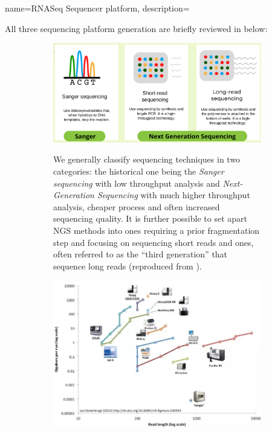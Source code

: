 {name=RNASeq Sequencer platform,
description={
All three sequencing platform generation are briefly reviewed in  below:
\begin{figure}
     \centering
     \begin{subfigure}[p]{0.4\textwidth}
         \centering
         \includegraphics[width=\textwidth]{figures/biological_introduction/Different types of sequencing techniques.png}
         \label{subfig:brief-library-comparison}
         \caption[\textbf{Sequencing techniques}]{We generally classify  sequencing techniques in two categories: the historical one being the \textit{Sanger sequencing} with low throughput analysis and \textit{Next-Generation Sequencing} with much higher throughput analysis, cheaper process and often increased sequencing quality. It is further possible to set apart NGS methods into ones requiring a prior fragmentation step and focusing on sequencing short reads and ones, often referred to as the \enquote{third generation} that sequence long reads (reproduced from \autocite[Fig. 1]{gallego23}).}
     \end{subfigure}
     \hfill
     \begin{subfigure}[p]{0.55\textwidth}
         \centering
         \includegraphics[width=\textwidth]{figures/biological_introduction/Difference-Between-NGS-and-Sanger-Sequencing-2.jpg}

\end{subfigure}
\end{figure}}}
